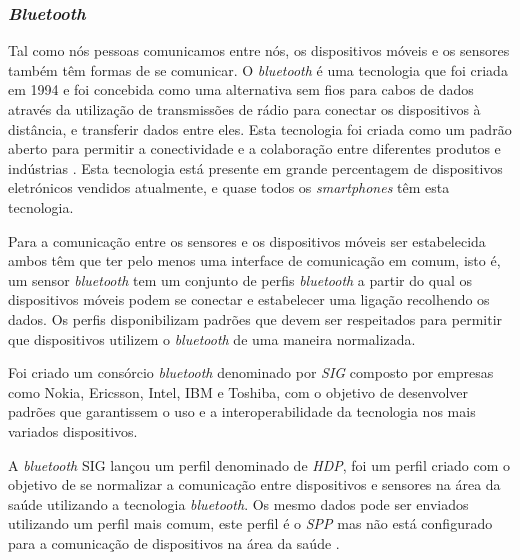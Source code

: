 \subsubsection{\textit{Bluetooth}}
Tal como nós pessoas comunicamos entre nós, os dispositivos móveis e os sensores também têm formas de se comunicar. %
O \textit{bluetooth} é uma tecnologia que foi criada em 1994 e foi concebida como uma alternativa sem fios para cabos de dados através da utilização de transmissões de rádio para conectar os dispositivos à distância, e transferir dados entre eles. Esta tecnologia foi criada como um padrão aberto para permitir a conectividade e a colaboração entre diferentes produtos e indústrias \cite{bluetooth}.
Esta tecnologia está presente em grande percentagem de dispositivos eletrónicos vendidos atualmente, e quase todos os \textit{smartphones} têm esta tecnologia.
\par 
Para a comunicação entre os sensores e os dispositivos móveis ser estabelecida ambos têm que ter pelo menos uma interface de comunicação em comum, isto é, um sensor \textit{bluetooth} tem um conjunto de perfis \textit{bluetooth} a partir do qual os dispositivos móveis podem se conectar e estabelecer uma ligação recolhendo os dados. 
Os perfis disponibilizam padrões que devem ser respeitados para permitir que dispositivos utilizem o \textit{bluetooth} de uma maneira normalizada. 
\par 
Foi criado um consórcio \textit{bluetooth} denominado por \textit{ \gls{SIG} } composto por empresas como Nokia, Ericsson, Intel, IBM e Toshiba, com o objetivo de desenvolver padrões que garantissem o uso e a interoperabilidade da tecnologia nos mais variados dispositivos.
\par
A \textit{bluetooth} \gls{SIG} lançou um perfil denominado de \textit{\gls{HDP}}, foi um perfil criado com o objetivo de se normalizar a comunicação entre dispositivos e sensores na área da saúde utilizando a tecnologia \textit{bluetooth}. Os mesmo dados pode ser enviados utilizando um perfil mais comum, este perfil é o \textit{\gls{SPP}} mas não está configurado para a comunicação de dispositivos na área da saúde \cite{bt-article}.




